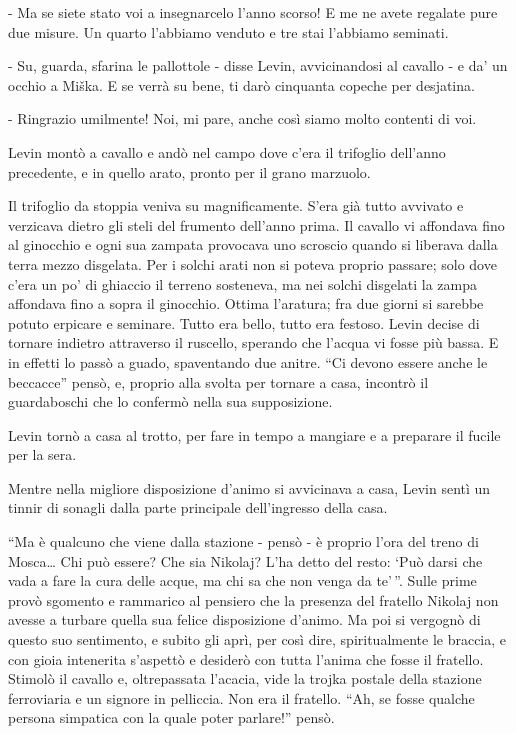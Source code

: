 - Ma se siete stato voi a insegnarcelo l'anno scorso! E me ne avete regalate pure due misure. Un quarto l'abbiamo venduto e tre stai l'abbiamo seminati. 

- Su, guarda, sfarina le pallottole - disse Levin, avvicinandosi al cavallo - e da' un occhio a Miška. E se verrà su bene, ti darò cinquanta copeche per desjatina. 

- Ringrazio umilmente! Noi, mi pare, anche così siamo molto contenti di voi. 

Levin montò a cavallo e andò nel campo dove c'era il trifoglio dell'anno precedente, e in quello arato, pronto per il grano marzuolo. 

Il trifoglio da stoppia veniva su magnificamente. S'era già tutto avvivato e verzicava dietro gli steli del frumento dell'anno prima. Il cavallo vi affondava fino al ginocchio e ogni sua zampata provocava uno scroscio quando si liberava dalla terra mezzo disgelata. Per i solchi arati non si poteva proprio passare; solo dove c'era un po' di ghiaccio il terreno sosteneva, ma nei solchi disgelati la zampa affondava fino a sopra il ginocchio. Ottima l'aratura; fra due giorni si sarebbe potuto erpicare e seminare. Tutto era bello, tutto era festoso. Levin decise di tornare indietro attraverso il ruscello, sperando che l'acqua vi fosse più bassa. E in effetti lo passò a guado, spaventando due anitre. ``Ci devono essere anche le beccacce'' pensò, e, proprio alla svolta per tornare a casa, incontrò il guardaboschi che lo confermò nella sua supposizione. 

Levin tornò a casa al trotto, per fare in tempo a mangiare e a preparare il fucile per la sera. 

\label{xiv-1} 

Mentre nella migliore disposizione d'animo si avvicinava a casa, Levin sentì un tinnir di sonagli dalla parte principale dell'ingresso della casa. 

``Ma è qualcuno che viene dalla stazione - pensò - è proprio l'ora del treno di Mosca\ldots{} Chi può essere? Che sia Nikolaj? L'ha detto del resto: `Può darsi che vada a fare la cura delle acque, ma chi sa che non venga da te'\,''. Sulle prime provò sgomento e rammarico al pensiero che la presenza del fratello Nikolaj non avesse a turbare quella sua felice disposizione d'animo. Ma poi si vergognò di questo suo sentimento, e subito gli aprì, per così dire, spiritualmente le braccia, e con gioia intenerita s'aspettò e desiderò con tutta l'anima che fosse il fratello. Stimolò il cavallo e, oltrepassata l'acacia, vide la trojka postale della stazione ferroviaria e un signore in pelliccia. Non era il fratello. ``Ah, se fosse qualche persona simpatica con la quale poter parlare!'' pensò. 

